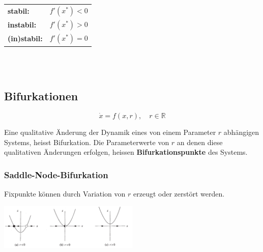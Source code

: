 \begin{tabular}{ll}
	\textbf{stabil:} \quad & $f'(x^*) < 0$ \\
	\textbf{instabil:} & $f'(x^*) > 0$ \\
	\textbf{(in)stabil:} & $f'(x^*) = 0$ \\
\end{tabular}\\ \\

\begin{multicols}{2}
	\subsection{Bifurkationen}
	
	\begin{equation*}
		\dot{x} = f(x,r), \quad r \in \mathbb{R}
	\end{equation*}
	
	Eine qualitative Änderung der Dynamik eines von einem Parameter $r$ abhängigen Systems, heisst Bifurkation. Die Parameterwerte von $r$ an denen diese qualitativen Änderungen erfolgen, heissen \textbf{Bifurkationspunkte} des Systems.
	\columnbreak
	\subsubsection{Saddle-Node-Bifurkation}
	Fixpunkte können durch Variation von $r$ erzeugt oder zerstört werden.
	
	\includegraphics[width=0.5\textwidth]{./images/Saddle_Node.png}
\end{multicols}

